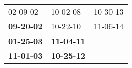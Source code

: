 \begin{supertabular}{p{0.33\columnwidth}p{0.33\columnwidth}p{0.33\columnwidth}}
          02-09-02\textsuperscript{} &           10-02-08\textsuperscript{} &  10-30-13\textsuperscript{} \\
 \textbf{09-20-02\textsuperscript{}} &           10-22-10\textsuperscript{} &  11-06-14\textsuperscript{} \\
 \textbf{01-25-03\textsuperscript{}} &  \textbf{11-04-11\textsuperscript{}} &                             \\
 \textbf{11-01-03\textsuperscript{}} &  \textbf{10-25-12\textsuperscript{}} &                             \\
\end{supertabular}
